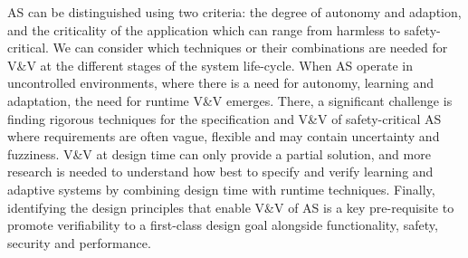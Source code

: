 \documentclass[sigconf,nonacm]{acmart}%
\begin{document}
	AS can be distinguished using two criteria: the degree of autonomy and adaption, and the criticality of the application which can range from harmless to safety-critical. 
	We can consider which techniques or their combinations are needed for V\&V at the different stages of the system life-cycle. 
	When AS operate in uncontrolled environments, where there is a need for autonomy, learning and adaptation, the need for runtime V\&V emerges. 
	There, a significant challenge is finding rigorous techniques for the specification and V\&V of safety-critical AS where requirements are often vague, flexible and may contain uncertainty and fuzziness. 
	V\&V at design time can only provide a partial solution, and more research is needed to understand how best to specify and verify learning and adaptive systems by combining design time with runtime techniques. 
	Finally, identifying the design principles that enable V\&V of AS is a key pre-requisite to promote verifiability to a first-class design goal alongside functionality, safety, security and performance.
	
\end{document}
